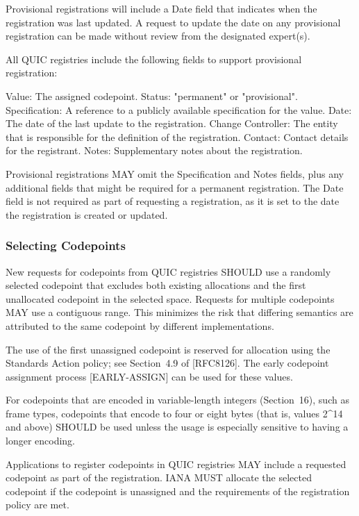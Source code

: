 \documentclass{article}
\begin{document}
Provisional registrations will include a Date field that indicates when the registration was last updated.  A request to update the date on any provisional registration can be made without review from the designated expert(s).

All QUIC registries include the following fields to support provisional registration:

Value:  The assigned codepoint. Status:  "permanent" or "provisional". Specification:  A reference to a publicly available specification for the value. Date:  The date of the last update to the registration. Change Controller:  The entity that is responsible for the definition of the registration. Contact:  Contact details for the registrant. Notes:  Supplementary notes about the registration.

Provisional registrations MAY omit the Specification and Notes fields, plus any additional fields that might be required for a permanent registration.  The Date field is not required as part of requesting a registration, as it is set to the date the registration is created or updated.

\subsubsection{Selecting Codepoints}

New requests for codepoints from QUIC registries SHOULD use a randomly selected codepoint that excludes both existing allocations and the first unallocated codepoint in the selected space.  Requests for multiple codepoints MAY use a contiguous range.  This minimizes the risk that differing semantics are attributed to the same codepoint by different implementations.

The use of the first unassigned codepoint is reserved for allocation using the Standards Action policy; see Section~4.9 of [RFC8126].  The early codepoint assignment process [EARLY-ASSIGN] can be used for these values.

For codepoints that are encoded in variable-length integers (Section~16), such as frame types, codepoints that encode to four or eight bytes (that is, values 2\textasciicircum{}14 and above) SHOULD be used unless the usage is especially sensitive to having a longer encoding.

Applications to register codepoints in QUIC registries MAY include a requested codepoint as part of the registration.  IANA MUST allocate the selected codepoint if the codepoint is unassigned and the requirements of the registration policy are met.
\end{document}
